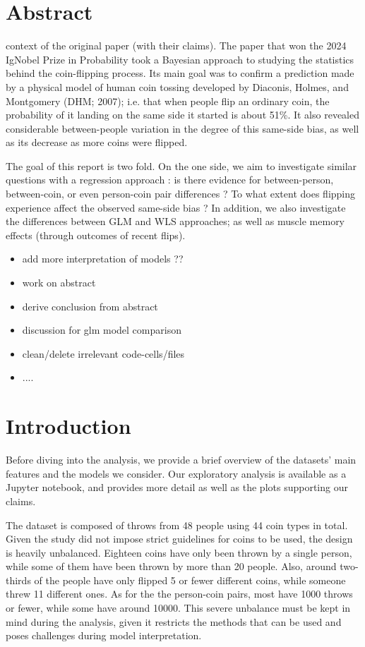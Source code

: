 \documentclass[a4paper, 12pt,oneside]{article}
\begin{document}
 
	 
	\clearpage
	\tableofcontents
	\thispagestyle{empty}
	\vspace{2cm}
	\section*{Abstract}
		context of the original paper (with their claims). The paper that won the 2024 IgNobel Prize in Probability took a Bayesian approach to studying the statistics behind the coin-flipping process. Its main goal was to confirm a prediction made by a physical model of human coin tossing developed by Diaconis, Holmes, and Montgomery (DHM; 2007); i.e. that when people flip an ordinary coin, the probability of it landing on the same side it started is about 51\%. 
		It also revealed considerable between-people variation in the degree of this same-side bias, as well as its decrease as more coins were flipped. 

		The goal of this report is two fold. On the one side, we aim to investigate similar questions with a regression approach : 
		is there evidence for between-person, between-coin, or even person-coin pair differences ? To what extent does flipping experience affect the observed same-side bias ?
		In addition, we also investigate the differences between GLM and WLS approaches; as well as muscle memory effects (through outcomes of recent flips). 
		\begin{itemize}
			\item add more interpretation of models ?? 
			\item work on abstract
			\item derive conclusion from abstract 
			\item discussion for glm model comparison
			\item clean/delete irrelevant code-cells/files
			\item ....
		\end{itemize}
	\clearpage
	\setcounter{page}{1}
	\section{Introduction}
		Before diving into the analysis, we provide a brief overview of the datasets' main features and the models we consider. Our exploratory analysis is available as a Jupyter notebook, and provides more detail as well as the plots supporting our claims.

		The dataset is composed of throws from 48 people using 44 coin types in total. Given the study did not impose strict guidelines for coins to be used, the design is heavily unbalanced. Eighteen coins have only been thrown by a single person, while some of them have been thrown by more than 20 people. Also, around two-thirds of the people have only flipped 5 or fewer different coins, while someone threw 11 different ones. As for the the person-coin pairs, most have 1000 throws or fewer, while some have around 10000. This severe unbalance must be kept in mind during the analysis, given it restricts the methods that can be used and poses challenges during model interpretation. 
\end{document}
